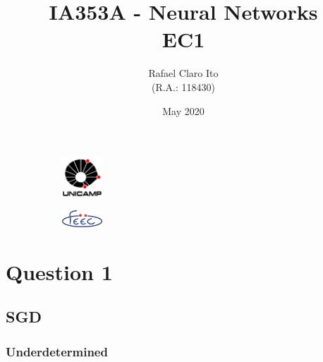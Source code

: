 \documentclass[a4paper]{article}    %
\begin{document}
\begin{figure}
    \centering
    \begin{subfigure}{0.45\textwidth}
        \centering
        \includegraphics[width=1.5cm]{unicamp}
    \end{subfigure}
    \hfill
    \begin{subfigure}{0.45\textwidth}
        \centering
        \includegraphics[width=1.5cm]{feec}
    \end{subfigure}
\end{figure}

\title{
    \vspace{5cm}
    IA353A - Neural Networks\\
    EC1
    \vspace{1cm}
}
\author{
    Rafael Claro Ito\\
    (R.A.: 118430)
    \vspace{11cm}
}
\date{May 2020}
\maketitle
\newpage

\section*{Question 1}

\addtocounter{section}{1}
\subsection{SGD}

\subsubsection{Underdetermined}


\end{document}
